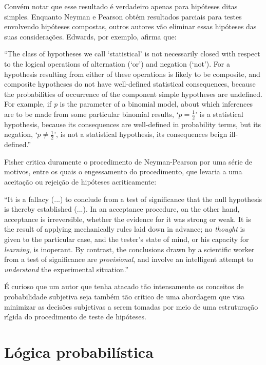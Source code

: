 Convém notar que esse resultado é verdadeiro apenas para hipóteses ditas simples. Enquanto Neyman e Pearson obtém resultados
parciais para testes envolvendo hipóteses compostas, outros autores vão eliminar essas hipóteses das suas considerações.
Edwards, por exemplo, afirma que:

``The class of hypotheses we call `statistical' is not necessarily closed with respect to the logical operations of
alternation (`or') and negation (`not'). For a hypothesis resulting from either of these operations is likely to be composite,
and composite hypotheses do not have well-defined statistical consequences, because the probabilities of occurrence of the
component simple hypotheses are undefined. For example, if {\em p} is the parameter of a binomial model, about which inferences
are to be made from some particular binomial results, `$p = \frac{1}{2}$' is a statistical hypothesis, because its 
consequences are well-defined in probability terms, but its negation, `$p \neq \frac{1}{2}$', is not a statistical hypothesis,
its consequences beign ill-defined.''\citep{Edwards72}

Fisher critica duramente o procedimento de Neyman-Pearson por uma série de motivos, entre os quais o engessamento do procedimento,
que levaria a uma aceitação ou rejeição de hipóteses acriticamente:

``It is a fallacy (...) to conclude from a test of significance that the null hypothesis is thereby established (...).
In an acceptance procedure, on the other hand, acceptance is irreversible, whether the evidence for it was strong or weak.
It is the result of applying mechanically rules laid down in advance; no {\em thought} is given to the particular case,
and the tester's state of mind, or his capacity for {\em learning}, is inoperant.
By contrast, the conclusions drawn by a scientific worker from a test of significance are {\em provisional}, and involve
an intelligent attempt to {\em understand} the experimental situation.''\citep{Fisher1955}

É curioso que um autor que tenha atacado tão intensamente os conceitos de probabilidade subjetiva seja também tão crítico de 
uma abordagem que visa minimizar as decisões subjetivas a serem tomadas por meio de uma estruturação rígida do procedimento
de teste de hipóteses. 

\section{Lógica probabilística}

